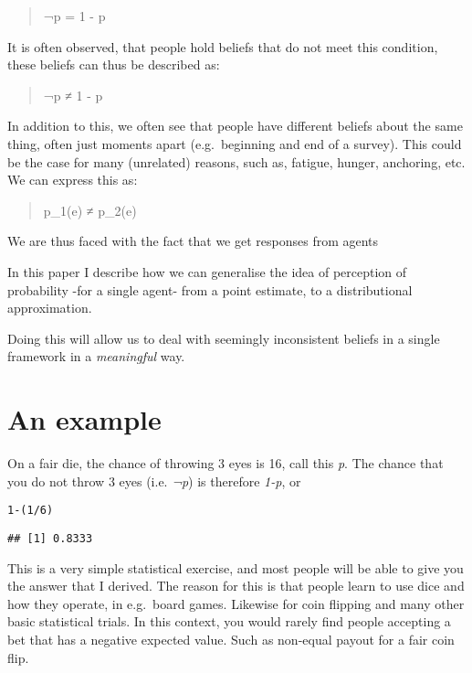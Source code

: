 \documentclass[a4paper]{book}\usepackage{graphicx, color}
\makeatletter
\newenvironment{kframe}{%
 \def\at@end@of@kframe{}%
 \ifinner\ifhmode%
  \def\at@end@of@kframe{\end{minipage}}%
  \begin{minipage}{\columnwidth}%
 \fi\fi%
 \def\FrameCommand##1{\hskip\@totalleftmargin \hskip-\fboxsep
 \colorbox{shadecolor}{##1}\hskip-\fboxsep
     \hskip-\linewidth \hskip-\@totalleftmargin \hskip\columnwidth}%
 \MakeFramed {\advance\hsize-\width
   \@totalleftmargin\z@ \linewidth\hsize
   \@setminipage}}%
 {\par\unskip\endMakeFramed%
 \at@end@of@kframe}
\newenvironment{knitrout}{}{} %
\makeatother
\begin{document}
\begin{quote}
¬p = 1 - p
\end{quote}

It is often observed, that people hold beliefs that do not meet this
condition, these beliefs can thus be described as:

\begin{quote}
¬p ≠ 1 - p
\end{quote}

In addition to this, we often see that people have different beliefs
about the same thing, often just moments apart (e.g.~beginning and end
of a survey). This could be the case for many (unrelated) reasons, such
as, fatigue, hunger, anchoring, etc. We can express this as:

\begin{quote}
p\_1(e) ≠ p\_2(e)
\end{quote}

We are thus faced with the fact that we get responses from agents

In this paper I describe how we can generalise the idea of perception of
probability -for a single agent- from a point estimate, to a
distributional approximation.

Doing this will allow us to deal with seemingly inconsistent beliefs in
a single framework in a \emph{meaningful} way.

\section{An example}

On a fair die, the chance of throwing 3 eyes is 16, call this \emph{p}.
The chance that you do not throw 3 eyes (i.e. \emph{¬p}) is therefore
\emph{1-p}, or

\begin{knitrout}
\color{fgcolor}\begin{kframe}
\begin{alltt}
1 - (1/6)
\end{alltt}
\begin{verbatim}
## [1] 0.8333
\end{verbatim}
\end{kframe}
\end{knitrout}


This is a very simple statistical exercise, and most people will be able
to give you the answer that I derived. The reason for this is that
people learn to use dice and how they operate, in e.g.~board games.
Likewise for coin flipping and many other basic statistical trials. In
this context, you would rarely find people accepting a bet that has a
negative expected value. Such as non-equal payout for a fair coin flip.
\end{document}
